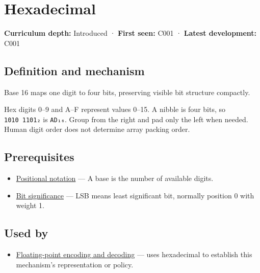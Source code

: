 \hypertarget{appendix-6b8075763724}{}\label{referencestart:appendix-6b8075763724}
\section{Hexadecimal}\label{appendix-6b8075763724-hexadecimal}

\textbf{Curriculum depth:} Introduced · \textbf{First seen:} C001 · \textbf{Latest development:} C001

\begin{allmightroledefinition}

\subsection{Definition and mechanism}\label{appendix-6b8075763724-definition-and-mechanism}

Base 16 maps one digit to four bits, preserving visible bit structure compactly.

\end{allmightroledefinition}

Hex digits 0--9 and A--F represent values 0--15. A nibble is four bits, so \texttt{1010\ 1101₂} is \texttt{AD₁₆}. Group from the right and pad only the left when needed. Human digit order does not determine array packing order.

\subsection{Prerequisites}\label{appendix-6b8075763724-prerequisites}

\begin{itemize}
\tightlist
\item
  \hyperref[appendix-83c3f28f7bda]{Positional notation} --- A base is the number of available digits.
\item
  \hyperref[appendix-280445746493]{Bit significance} --- LSB means least significant bit, normally position 0 with weight 1.
\end{itemize}

\subsection{Used by}\label{appendix-6b8075763724-used-by}

\begin{itemize}
\tightlist
\item
  \hyperref[appendix-6854d0e2218e]{Floating-point encoding and decoding} --- uses hexadecimal to establish this mechanism's representation or policy.
\end{itemize}

